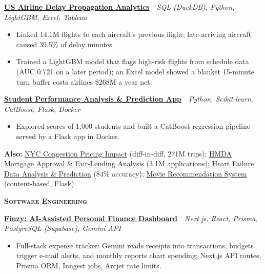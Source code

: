 \documentclass[10pt, letterpaper]{article}
\newcommand{\project}[3]{%
    \textbf{\href{#2}{#1}} \,\textbar\, {\small\textit{#3}}%
}
\newcommand{\subhead}[1]{%
    {\small\bfseries\scshape #1}\par\vspace{1pt}%
}
\begin{document}
\vspace{3pt}
\project{US Airline Delay Propagation Analytics}%
{https://github.com/SameeulKhondokerJisan/airline-delay-propagation-analytics}%
{SQL (DuckDB), Python, LightGBM, Excel, Tableau}
\begin{itemize}
    \item Linked 14.1M flights to each aircraft's previous flight; late-arriving aircraft caused 39.5\% of
          delay minutes.
    \item Trained a LightGBM model that flags high-risk flights from schedule data (AUC 0.721 on a later
          period); an Excel model showed a blanket 15-minute turn buffer costs airlines \$268M a year net.
\end{itemize}

\vspace{3pt}
\project{Student Performance Analysis \& Prediction App}%
{https://github.com/SameeulKhondokerJisan/student-performance-analysis}%
{Python, Scikit-learn, CatBoost, Flask, Docker}
\begin{itemize}
    \item Explored scores of 1,000 students and built a CatBoost regression pipeline served by a Flask app in Docker.
\end{itemize}

\vspace{2pt}
{\small\textbf{Also:}
\href{https://github.com/SameeulKhondokerJisan/nyc-congestion-pricing-impact}{NYC Congestion Pricing Impact}
(diff-in-diff, 271M trips);
\href{https://github.com/SameeulKhondokerJisan/hmda-mortgage-approval-fair-lending}{HMDA Mortgage Approval \& Fair-Lending Analysis}
(3.1M applications);
\href{https://github.com/SameeulKhondokerJisan/heart-failure-data-analysis}{Heart Failure Data Analysis \& Prediction}
(84\% accuracy);
\href{https://github.com/SameeulKhondokerJisan/movie-recommendation-system}{Movie Recommendation System}
(content-based, Flask).}

\vspace{6pt}
\subhead{Software Engineering}

\project{Finzy: AI-Assisted Personal Finance Dashboard}%
{https://github.com/SameeulKhondokerJisan/finzy-personal-finance-analytics-dashboard}%
{Next.js, React, Prisma, PostgreSQL (Supabase), Gemini API}
\begin{itemize}
    \item Full-stack expense tracker: Gemini reads receipts into transactions, budgets trigger e-mail alerts,
          and monthly reports chart spending; Next.js API routes, Prisma ORM, Inngest jobs, Arcjet rate limits.
\end{itemize}
\end{document}
